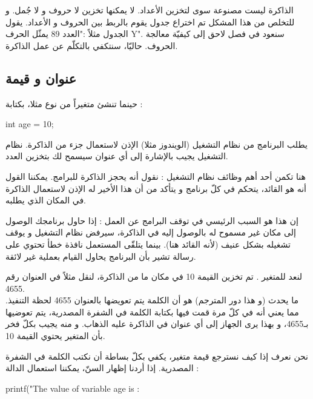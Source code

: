 الذاكرة ليست مصنوعة سوى لتخزين الأعداد. لا يمكنها تخزين لا حروف و لا جُمل. و للتخلص من هذا المشكل تم اختراع جدول يقوم بالربط بين الحروف و الأعداد. يقول الجدول مثلاً :"العدد 89 يمثّل الحرف
\textenglish{Y}".
سنعود في فصل لاحق إلى كيفيّة معالجة الحروف. حاليّا، سنتكفي بالتكلّم عن عمل الذاكرة.

\subsection{عنوان و قيمة}

حينما تنشئ متغيراً
من نوع
مثلا، بكتابة :

\begin{Csource}
int age = 10;
\end{Csource}

يطلب البرنامج من نظام التشغيل (الويندوز مثلا) الإذن لاستعمال جزء من الذاكرة. نظام التشغيل يجيب بالإشارة إلى أي عنوان سيسمح لك بتخزين العدد.

هنا تكمن أحد أهم وظائف نظام التشغيل : نقول أنه يحجز الذاكرة للبرامج. يمكننا القول أنه هو القائد، يتحكم في كلّ برنامج و يتأكد من أن هذا الأخير له الإذن لاستعمال الذاكرة في المكان الذي يطلبه.

\begin{information}
إن هذا هو السبب الرئيسي في توقف البرامج عن العمل : إذا حاول برنامجك الوصول إلى مكان غير مسموح له بالوصول إليه في الذاكرة، سيرفض نظام التشغيل و يوقف تشغيله بشكل عنيف (لأنه القائد هنا). بينما يتلقّى المستعمل نافذة خطأ تحتوي على رسالة تشير بأن البرنامج يحاول القيام بعملية غير لائقة.
\end{information}

لنعد للمتغير
.
تم تخزين القيمة 10 في مكان ما من الذاكرة، لنقل مثلاً في العنوان رقم 4655.\\
ما يحدث (و هذا دور المترجم) هو أن الكلمة
يتم تعويضها بالعنوان 4655 لحظة التنفيذ. مما يعني أنه في كلّ مرة قمت فيها بكتابة الكلمة
في الشفرة المصدرية، يتم تعوضيها بـ4655، و بهذا يرى الجهاز إلى أي عنوان في الذاكرة عليه الذهاب. و منه يجيب بكلّ فخر بأن المتغير
يحتوي القيمة 10.

نحن نعرف إذا كيف نسترجع قيمة متغير، يكفي بكلّ بساطة أن نكتب الكلمة
في الشفرة المصدرية. إذا أردنا إظهار السنّ، يمكننا استعمال الدالة
 :

\begin{Csource}
printf("The value of variable age is : %
\end{Csource}

